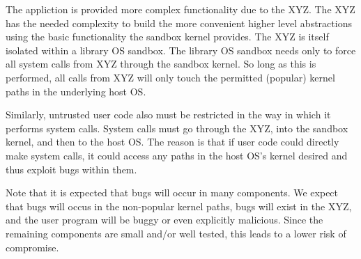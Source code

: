 The appliction is provided more complex functionality due to the XYZ.  The XYZ
has the needed complexity to build the more convenient higher level 
abstractions using the basic functionality the sandbox kernel provides.  The
XYZ is itself isolated within a library OS sandbox.  The library OS sandbox 
needs only to force all system calls from XYZ through the sandbox kernel.
So long as this is performed, all calls from XYZ will only touch the permitted
(popular) kernel paths in the underlying host OS.

Similarly, untrusted user code also must be restricted in the way in which 
it performs system calls.  System calls must go through the XYZ, into the
sandbox kernel, and then to the host OS.  The reason is that if user code 
could directly make system calls, it could access any paths in the host OS's
kernel desired and thus exploit bugs within them.

Note that it is expected that bugs will occur in many components.  We expect
that bugs will occus in the non-popular kernel paths, bugs will exist in
the XYZ, and the user program will be buggy or even explicitly malicious.
Since the remaining components are small and/or well tested, this leads
to a lower risk of compromise.




